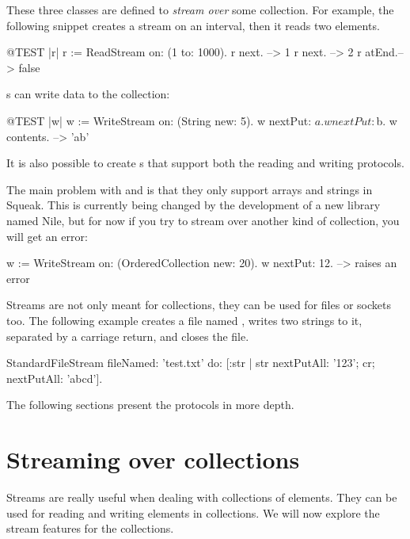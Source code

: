 \documentclass[a4paper,10pt,twoside]{book}
\begin{document}
These three classes are defined to \emph{stream over} some collection.
For example, the following snippet creates a stream on an interval,
then it reads two elements.
\begin{code}{@TEST |r|}
r := ReadStream on: (1 to: 1000).
r next.   --> 1
r next.   --> 2
r atEnd.--> false
\end{code}

s can write data to the collection:
\begin{code}{@TEST |w|}
w := WriteStream on: (String new: 5).
w nextPut: $a.
w nextPut: $b.
w contents. -->  'ab'
\end{code}

It is also possible to create s that support both
the reading and writing protocols.

The main problem with  and  is
that they only support arrays and strings in Squeak. This is currently
being changed by the development of a new library named Nile, 
but for now if you try to stream over another kind of
collection, you will get an error:

\begin{code}{}
w := WriteStream on: (OrderedCollection new: 20).
w nextPut: 12. -->  raises an error
\end{code}

Streams are not only meant for collections, they can be used for files or sockets
too. The following example creates a file named , writes two strings to it, separated by a carriage return, and closes the file.

\begin{code}{}
StandardFileStream
  fileNamed: 'test.txt'
  do: [:str | str
                nextPutAll: '123';
                cr;
                nextPutAll: 'abcd'].
\end{code}

The following sections present the protocols in more depth.

\section{Streaming over collections}

Streams are really useful when dealing with collections of
elements. They can be used for reading and writing elements in
collections. We will now explore the stream features for the
collections.
\end{document}
